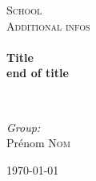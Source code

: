 \begin{titlepage}
\begin{center}



\textsc{\LARGE School}\\[1.5cm]

\textsc{\Large Additional infos}\\[0.5cm]

\HRule \\[0.4cm]
{ \huge \bfseries Title \\ end of title \\[0.4cm] }

\HRule \\[1.5cm]

\begin{center} \large
\emph{Group:}\\
Prénom \textsc{Nom}
\end{center}

\vfill

{\large \today}

\end{center}
\end{titlepage}